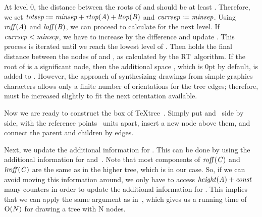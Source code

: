 At level 0, the distance between the roots of  and                
should be at least . Therefore, we set                              
${\it totsep\/}:={\it minsep\/} + {\it rtop\/}({\it A\/})                               
+ {\it ltop\/}({\it B\/})$ and ${\it currsep\/}:={\it minsep\/}$.                       
Using ${\it roff\/}({\it A\/})$ and ${\it loff\/}({\it B\/})$, we can                   
proceed to calculate  for the next level.                          
If ${\it currsep\/} < {\it minsep\/}$, we have to increase  by          
the difference and update . This process is                        
iterated until we reach the lowest level of .                            
Then  holds the final distance between the                          
nodes of  and , as calculated by the RT~algorithm. 
If the root of  is a significant node, then the additional space ,
which is 0pt by default, is added to .               
However, the approach of synthesizing                                           
drawings from simple graphics characters allows only a finite                   
number of orientations for the tree edges; therefore,               
must be increased slightly to fit the next orientation                          
available.                                                                      
                                                                                
Now we are ready to construct the box of \TeX{}tree~.                    
Simply put  and~ side by side, with the reference                      
points ~units apart, insert a new node                              
above them, and connect the parent and children by edges.                       
                                                                                
Next, we update the additional information                                      
for . This can be done by using the additional information               
for  and~.                                                        
Note that most components of ${\it roff\/}({\it C\/})$ and                          
${\it lroff\/}({\it C\/})$ are the same as in the higher tree, which                
is  in our case.                                                         
So, if we can avoid moving this information around, we only have                
to access ${\it height\/}({\it A\/}) + {\it const\/}$ many counters in                
order to update the additional information for .                         
This implies that we can apply the same argument as                             
in~\cite{TidierTrees}, which gives                                              
us a running time of ${\rm O}(N)$ for drawing a tree with N nodes.                   
                                                                                
